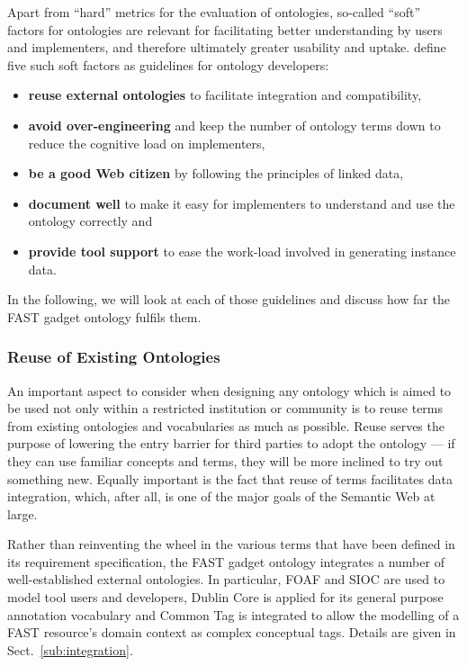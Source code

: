 \documentclass[twoside]{fast_latex}
\begin{document}
Apart from ``hard'' metrics for the evaluation of ontologies, so-called ``soft'' factors for ontologies are relevant for facilitating better understanding by users and implementers, and therefore ultimately greater usability and uptake. \cite{moeller2009ontology_soft_skills} define five such soft factors as guidelines for ontology developers:

\singlespacing
\begin{itemize}
	\item \textbf{reuse external ontologies} to facilitate integration and compatibility,
	\item \textbf{avoid over-engineering} and keep the number of ontology terms down to reduce the cognitive load on implementers,
	\item \textbf{be a good Web citizen} by following the principles of linked data,
	\item \textbf{document well} to make it easy for implementers to understand and use the ontology correctly and
	\item \textbf{provide tool support} to ease the work-load involved in generating instance data.
\end{itemize}
\doublespacing

In the following, we will look at each of those guidelines and discuss how far the FAST gadget ontology fulfils them.

\subsubsection{Reuse of Existing Ontologies} %
\label{ssub:reuse_of_existing_ontologies}

An important aspect to consider when designing any ontology which is aimed to be used not only within a restricted institution or community is to reuse terms from existing ontologies and vocabularies as much as possible. Reuse serves the purpose of lowering the entry barrier for third parties to adopt the ontology --- if they can use familiar concepts and terms, they will be more inclined to try out something new. Equally important is the fact that reuse of terms facilitates data integration, which, after all, is one of the major goals of the Semantic Web at large.

Rather than reinventing the wheel in the various terms that have been defined in its requirement specification, the FAST gadget ontology integrates a number of well-established external ontologies. In particular, FOAF and SIOC are used to model tool users and developers, Dublin Core is applied for its general purpose annotation vocabulary and Common Tag is integrated to allow the modelling of a FAST resource's domain context as complex conceptual tags. Details are given in Sect.~\ref{sub:integration}.
\end{document}
